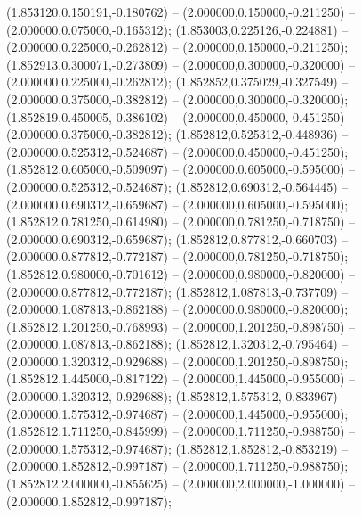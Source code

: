  (1.853120,0.150191,-0.180762) -- (2.000000,0.150000,-0.211250) -- (2.000000,0.075000,-0.165312);
 (1.853003,0.225126,-0.224881) -- (2.000000,0.225000,-0.262812) -- (2.000000,0.150000,-0.211250);
 (1.852913,0.300071,-0.273809) -- (2.000000,0.300000,-0.320000) -- (2.000000,0.225000,-0.262812);
 (1.852852,0.375029,-0.327549) -- (2.000000,0.375000,-0.382812) -- (2.000000,0.300000,-0.320000);
 (1.852819,0.450005,-0.386102) -- (2.000000,0.450000,-0.451250) -- (2.000000,0.375000,-0.382812);
 (1.852812,0.525312,-0.448936) -- (2.000000,0.525312,-0.524687) -- (2.000000,0.450000,-0.451250);
 (1.852812,0.605000,-0.509097) -- (2.000000,0.605000,-0.595000) -- (2.000000,0.525312,-0.524687);
 (1.852812,0.690312,-0.564445) -- (2.000000,0.690312,-0.659687) -- (2.000000,0.605000,-0.595000);
 (1.852812,0.781250,-0.614980) -- (2.000000,0.781250,-0.718750) -- (2.000000,0.690312,-0.659687);
 (1.852812,0.877812,-0.660703) -- (2.000000,0.877812,-0.772187) -- (2.000000,0.781250,-0.718750);
 (1.852812,0.980000,-0.701612) -- (2.000000,0.980000,-0.820000) -- (2.000000,0.877812,-0.772187);
 (1.852812,1.087813,-0.737709) -- (2.000000,1.087813,-0.862188) -- (2.000000,0.980000,-0.820000);
 (1.852812,1.201250,-0.768993) -- (2.000000,1.201250,-0.898750) -- (2.000000,1.087813,-0.862188);
 (1.852812,1.320312,-0.795464) -- (2.000000,1.320312,-0.929688) -- (2.000000,1.201250,-0.898750);
 (1.852812,1.445000,-0.817122) -- (2.000000,1.445000,-0.955000) -- (2.000000,1.320312,-0.929688);
 (1.852812,1.575312,-0.833967) -- (2.000000,1.575312,-0.974687) -- (2.000000,1.445000,-0.955000);
 (1.852812,1.711250,-0.845999) -- (2.000000,1.711250,-0.988750) -- (2.000000,1.575312,-0.974687);
 (1.852812,1.852812,-0.853219) -- (2.000000,1.852812,-0.997187) -- (2.000000,1.711250,-0.988750);
 (1.852812,2.000000,-0.855625) -- (2.000000,2.000000,-1.000000) -- (2.000000,1.852812,-0.997187);

